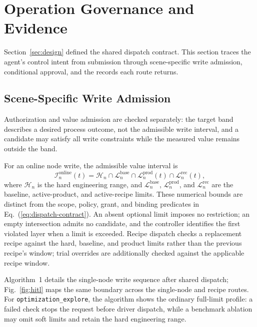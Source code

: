 \section{Operation Governance and Evidence}
\label{sec:modules}
Section~\ref{sec:design} defined the shared dispatch contract. This section traces the agent's control intent from submission through scene-specific write admission,
conditional approval, and the records each route returns.

\subsection{Scene-Specific Write Admission}
\label{sec:governed}
Authorization and value admission are checked separately: the target band describes a desired process outcome, not the admissible write interval, and a candidate may satisfy all write constraints while the measured value remains outside the band.

For an online node write, the admissible value interval is
\begin{equation}
\mathcal{I}^{\mathrm{online}}_n(t)=
\mathcal{H}_n\cap\mathcal{L}^{\mathrm{base}}_n\cap\mathcal{L}^{\mathrm{prod}}_n(t)\cap\mathcal{L}^{\mathrm{rec}}_n(t),
\label{eq:admission}
\end{equation}
where $\mathcal{H}_n$ is the hard engineering range, and
$\mathcal{L}^{\mathrm{base}}_n$, $\mathcal{L}^{\mathrm{prod}}_n$, and
$\mathcal{L}^{\mathrm{rec}}_n$ are the baseline, active-product, and
active-recipe limits. These numerical bounds are distinct from the scope,
policy, grant, and binding predicates in Eq.~(\ref{eq:dispatch-contract}).
An absent optional limit imposes no restriction; an empty intersection admits no candidate, and the controller identifies the first violated layer when a limit is exceeded. Recipe dispatch checks a replacement recipe against the hard, baseline, and product limits rather than the previous recipe's window; trial overrides are additionally checked against the applicable recipe window.

Algorithm~1 details the single-node write sequence after shared dispatch; Fig.~\ref{fig:hitl} maps the same boundary across the single-node and recipe routes. For
\texttt{optimization\_explore}, the algorithm shows the ordinary full-limit profile: a failed
check stops the request before driver dispatch, while a benchmark ablation may
omit soft limits and retain the hard engineering range.

